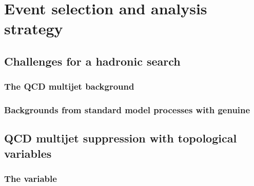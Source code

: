 \chapter{Event selection and analysis strategy}
\label{chap:selection}



\section{Challenges for a hadronic \BSM search}
\label{sec:challenge}


\subsection{The QCD multijet background}




\subsection{Backgrounds from standard model processes with genuine
\MET}



\section{QCD multijet suppression with topological variables}
\label{sec:challenge}


\subsection{The \alphat variable}

